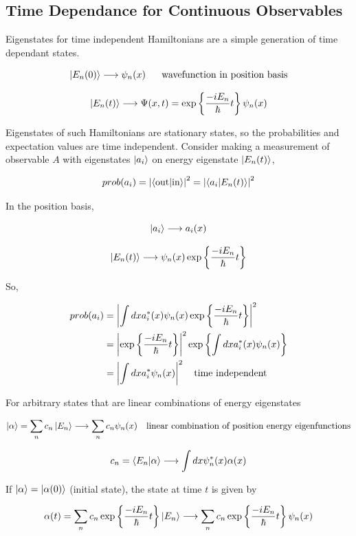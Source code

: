 \documentclass[english, 11pt]{article}
\begin{document}
    \subsection{Time Dependance for Continuous Observables}

      Eigenstates for time independent Hamiltonians are a simple generation of time dependant states.

      \[ \ket{E_n(0)} \longrightarrow \psi_n(x) \ \ \ \ \ \mbox{wavefunction in position basis} \]

      \[ \left|E_n(t)\right\rangle \longrightarrow \Psi(x, t) = \exp \left\{ \frac{-iE_n}{\hbar} t \right\}\psi_n(x) \]

      Eigenstates of such Hamiltonians are stationary states, so the probabilities and expectation values are time independent. Consider making a measurement of observable $A$ with eigenstates $\left|a_i\right\rangle$ on energy eigenstate $\left|E_n(t)\right\rangle$,

      \[ prob(a_i) = \pr{\braket{\mbox{out}}{\mbox{in}}} = \pr{\braket{a_i}{E_n(t)}} \]

      In the position basis,

      \[ \left|a_i\right\rangle \longrightarrow a_i(x) \]

      \[ \left|E_n(t)\right\rangle \longrightarrow \psi_n(x) \exp \left\{ \frac{-iE_n}{\hbar}t \right\} \]

      So,

      \begin{align*}
        prob(a_i) & = \left|\int dx a_i^*(x) \psi_n(x)\exp \left\{ \frac{-iE_n}{\hbar}t \right\}\right|^2 \\
        & = \left|\exp \left\{ \frac{-iE_n}{\hbar}t \right\}\right|^2\exp \left\{ \int dx a_i^*(x)\psi_n(x) \right\} \\
        & = \left|\int dx a_i^* \psi_n(x)\right|^2 \ \ \ \mbox{time independent}
      \end{align*}

      For arbitrary states that are linear combinations of energy eigenstates

      \[ \left|\alpha\right\rangle = \sum_n c_n \left|E_n\right\rangle \longrightarrow \sum_n c_n \psi_n(x) \ \ \ \mbox{linear combination of position energy eigenfunctions} \]

      \[ c_n = \braket{E_n}{\alpha} \longrightarrow \int dx \psi_n^*(x) \alpha(x) \]

      If $\left|\alpha\right\rangle = \left|\alpha(0)\right\rangle$ (initial state), the state at time $t$ is given by

      \[ \alpha(t) = \sum_n c_n \exp \left\{ \frac{-iE_n}{\hbar}t \right\} \left|E_n\right\rangle \longrightarrow \sum_n c_n \exp \left\{ \frac{-iE_n}{\hbar}t \right\}\psi_n(x) \]
\end{document}
